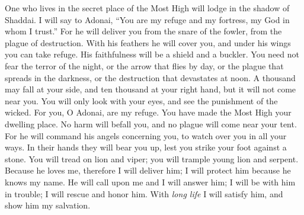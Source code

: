 \begin{biblechapter} %
 One who lives in the secret place of the Most High 
will lodge in the shadow of Shaddai.
\verse I will say to Adonai, “You are my refuge and my fortress, 
my God in whom I trust.”
\verse For he will deliver you from the snare of the fowler, 
from the plague of destruction.
\verse With his feathers he will cover you, 
and under his wings you can take refuge. 
His faithfulness will be a shield and a buckler.
\verse You need not fear the terror of the night, 
or the arrow that flies by day,
\verse or the plague that spreads in the darkness, 
or the destruction that devastates at noon.
\verse A thousand may fall at your side, 
and ten thousand at your right hand, 
but it will not come near you.
\verse You will only look with your eyes, 
and see the punishment of the wicked.
\verse For you, O Adonai, are my refuge. 
You have made the Most High your dwelling place.
\verse No harm will befall you, 
and no plague will come near your tent.
\verse For he will command his angels concerning you, 
to watch over you in all your ways.
\verse In their hands they will bear you up, 
lest you strike your foot against a stone.
\verse You will tread on lion and viper; 
you will trample young lion and serpent.
\verse Because he loves me, therefore I will deliver him; 
I will protect him because he knows my name.
\verse He will call upon me and I will answer him; 
I will be with him in trouble; 
I will rescue and honor him.
\verse With \textit{long life} I will satisfy him, 
and show him my salvation.
\end{biblechapter}

